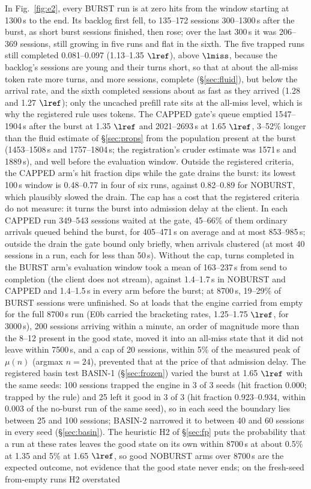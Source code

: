In Fig.~\ref{fig:e2}, every BURST run is at zero hits from the window starting at 1300\,s to the end. Its backlog first fell, to 135--172 sessions 300--1300\,s after the burst, as short burst sessions finished, then rose; over the last 300\,s it was 206--369 sessions, still growing in five runs and flat in the sixth. The five trapped runs still completed 0.081--0.097\sps{} (1.13--1.35 $\lref$), above $\lmiss$, because the backlog's sessions are young and their turns short, so that at about the all-miss token rate more turns, and more sessions, complete (\S\ref{sec:fluid}), but below the arrival rate, and the sixth completed sessions about as fast as they arrived (1.28 and 1.27 $\lref$); only the uncached prefill rate sits at the all-miss level, which is why the registered rule uses tokens. The CAPPED gate's queue emptied 1547--1904\,s after the burst at 1.35 $\lref$ and 2021--2693\,s at 1.65 $\lref$, 3--52\% longer than the fluid estimate of \S\ref{sec:props} from the population present at the burst (1453--1508\,s and 1757--1804\,s; the registration's cruder estimate was 1571\,s and 1889\,s), and well before the evaluation window. Outside the registered criteria, the CAPPED arm's hit fraction dips while the gate drains the burst: its lowest 100\,s window is 0.48--0.77 in four of six runs, against 0.82--0.89 for NOBURST, which plausibly slowed the drain. The cap has a cost that the registered criteria do not measure: it turns the burst into admission delay at the client. In each CAPPED run 349--543 sessions waited at the gate, 45--66\% of them ordinary arrivals queued behind the burst, for 405--471\,s on average and at most 853--985\,s; outside the drain the gate bound only briefly, when arrivals clustered (at most 40 sessions in a run, each for less than 50\,s). Without the cap, turns completed in the BURST arm's evaluation window took a mean of 163--237\,s from send to completion (the client does not stream), against 1.4--1.7\,s in NOBURST and CAPPED and 1.4--1.5\,s in every arm before the burst; at 8700\,s, 19--29\% of BURST sessions were unfinished. So at loads that the engine carried from empty for the full 8700\,s run (E0b carried the bracketing rates, 1.25--1.75 $\lref$, for 3000\,s), 200 sessions arriving within a minute, an order of magnitude more than the 8--12 present in the good state, moved it into an all-miss state that it did not leave within 7500\,s, and a cap of 20 sessions, within 5\% of the measured peak of $\mu(n)$ (argmax $n=24$), prevented that at the price of that admission delay. The registered basin test BASIN-1 (\S\ref{sec:frozen}) varied the burst at 1.65 $\lref$ with the same seeds: 100 sessions trapped the engine in 3 of 3 seeds (hit fraction 0.000; trapped by the rule) and 25 left it good in 3 of 3 (hit fraction 0.923--0.934, within 0.003 of the no-burst run of the same seed), so in each seed the boundary lies between 25 and 100 sessions; BASIN-2 narrowed it to between 40 and 60 sessions in every seed (\S\ref{sec:basin}). The heuristic H2 of \S\ref{sec:fp} puts the probability that a run at these rates leaves the good state on its own within 8700\,s at about 0.5\% at 1.35 and 5\% at 1.65 $\lref$, so good NOBURST arms over 8700\,s are the expected outcome, not evidence that the good state never ends; on the fresh-seed from-empty runs H2 overstated 